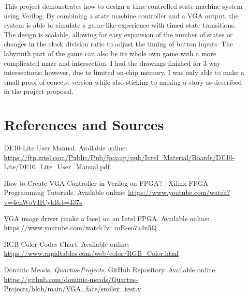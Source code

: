\documentclass{article}
\begin{document}
This project demonstrates how to design a time-controlled state machine system using Verilog. By combining a state machine controller and a VGA output, the system is able to simulate a game-like experience with timed state transitions. The design is scalable, allowing for easy expansion of the number of states or changes in the clock division ratio to adjust the timing of button inputs. The labyrinth part of the game can also be its whole own game with a more complicated maze and intersection. I had the drawings finished for 3-way intersections; however, due to limited on-chip memory, I was only able to make a small proof-of-concept version while also sticking to making a story as described in the project proposal.

\clearpage

\section*{References and Sources}
\begin{thebibliography}{9}

 DE10-Lite User Manual. Available online: \url{https://ftp.intel.com/Public/Pub/fpqaup/pub/Intel_Material/Boards/DE10-Lite/DE10_Lite_User_Manual.pdf}

 How to Create VGA Controller in Verilog on FPGA? | Xilinx FPGA Programming Tutorials. Available online: \url{https://www.youtube.com/watch?v=4enWoVHCykl&t=437s}

 VGA image driver (make a face) on an Intel FPGA. Available online: \url{https://www.youtube.com/watch?v=mR-eo7a4n5Q}

 RGB Color Codes Chart. Available online: \url{https://www.rapidtables.com/web/color/RGB_Color.html}

 Dominic Meads, \textit{Quartus-Projects}. GitHub Repository. Available online: \url{https://github.com/dominic-meads/Quartus-Projects/blob/main/VGA_face/smiley_test.v}

\end{thebibliography}
\end{document}
